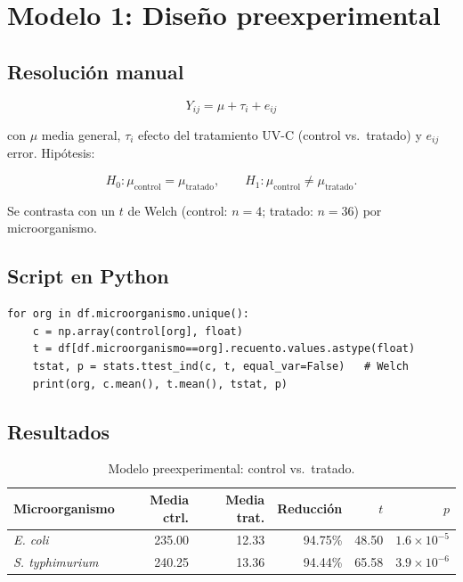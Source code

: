\documentclass[12pt,a4paper]{article}
\begin{document}
\section{Modelo 1: Diseño preexperimental}

\subsection{Resolución manual}

\[
Y_{ij} = \mu + \tau_i + e_{ij}
\]

con $\mu$ media general, $\tau_i$ efecto del tratamiento UV-C (control vs.\ tratado) y $e_{ij}$ error. Hipótesis:

\[
H_0: \mu_{\text{control}} = \mu_{\text{tratado}}, \qquad
H_1: \mu_{\text{control}} \neq \mu_{\text{tratado}}.
\]

Se contrasta con un $t$ de Welch (control: $n=4$; tratado: $n=36$) por microorganismo.

\subsection{Script en Python}

\begin{lstlisting}[caption={Prueba t de control vs.\ tratado.}]
for org in df.microorganismo.unique():
    c = np.array(control[org], float)
    t = df[df.microorganismo==org].recuento.values.astype(float)
    tstat, p = stats.ttest_ind(c, t, equal_var=False)   # Welch
    print(org, c.mean(), t.mean(), tstat, p)
\end{lstlisting}

\subsection{Resultados}

\begin{table}[H]
\centering
\caption{Modelo preexperimental: control vs.\ tratado.}
\begin{tabular}{lrrrrr}
\toprule
\textbf{Microorganismo} & \textbf{Media ctrl.} & \textbf{Media trat.} & \textbf{Reducción} & \textbf{$t$} & \textbf{$p$}\\
\midrule
\textit{E. coli} & 235.00 & 12.33 & 94.75\% & 48.50 & $1.6\times10^{-5}$\\
\textit{S. typhimurium} & 240.25 & 13.36 & 94.44\% & 65.58 & $3.9\times10^{-6}$\\
\bottomrule
\end{tabular}
\end{table}
\end{document}

